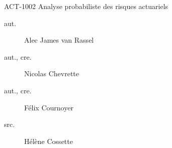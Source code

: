 \begin{contrib}{ACT-1002\: Analyse probabiliste des risques actuariels}
\begin{description}
	\item[aut.] Alec James van Rassel
	\item[aut., cre.] Nicolas Chevrette
	\item[aut., cre.] Félix Cournoyer
	\item[src.] Hélène Cossette
\end{description}
\end{contrib}